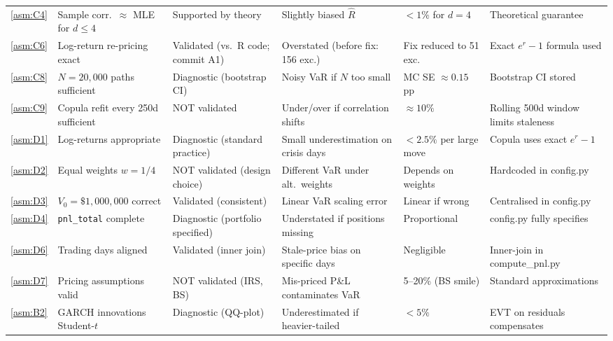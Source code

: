 \documentclass[11pt,a4paper]{article}
\newcommand{\code}[1]{\texttt{#1}}
\begin{document}
\begin{footnotesize}
\begin{longtable}{@{}p{0.65cm} p{4.0cm} p{2.6cm} p{3.4cm} p{2.0cm} p{2.8cm}@{}}
\cref{asm:C4}  & Sample corr.\ $\approx$ MLE for $d\le4$ & Supported by theory & Slightly biased $\hat{R}$ & $<1\%$ for $d=4$ & Theoretical guarantee \\[4pt]

\cref{asm:C6}  & Log-return re-pricing exact & Validated (vs.\ R code; commit A1) & Overstated (before fix: 156 exc.) & Fix reduced to 51 exc. & Exact $e^r-1$ formula used \\[4pt]

\cref{asm:C8}  & $N=20{,}000$ paths sufficient & Diagnostic (bootstrap CI) & Noisy VaR if $N$ too small & MC SE $\approx 0.15$ pp & Bootstrap CI stored \\[4pt]

\cref{asm:C9}  & Copula refit every 250d sufficient & NOT validated & Under/over if correlation shifts & $\approx 10\%$ & Rolling 500d window limits staleness \\[4pt]

\cref{asm:D1}  & Log-returns appropriate & Diagnostic (standard practice) & Small underestimation on crisis days & $<2.5\%$ per large move & Copula uses exact $e^r-1$ \\[4pt]

\cref{asm:D2}  & Equal weights $w=1/4$ & NOT validated (design choice) & Different VaR under alt.\ weights & Depends on weights & Hardcoded in config.py \\[4pt]

\cref{asm:D3}  & $V_0=\$1{,}000{,}000$ correct & Validated (consistent) & Linear VaR scaling error & Linear if wrong & Centralised in config.py \\[4pt]

\cref{asm:D4}  & \code{pnl\_total} complete & Diagnostic (portfolio specified) & Understated if positions missing & Proportional & config.py fully specifies \\[4pt]

\cref{asm:D6}  & Trading days aligned & Validated (inner join) & Stale-price bias on specific days & Negligible & Inner-join in compute\_pnl.py \\[4pt]

\cref{asm:D7}  & Pricing assumptions valid & NOT validated (IRS, BS) & Mis-priced P\&L contaminates VaR & 5--20\% (BS smile) & Standard approximations \\[4pt]

\cref{asm:B2}  & GARCH innovations Student-$t$ & Diagnostic (QQ-plot) & Underestimated if heavier-tailed & $<5\%$ & EVT on residuals compensates \\[4pt]


\end{longtable}
\end{footnotesize}
\end{document}
